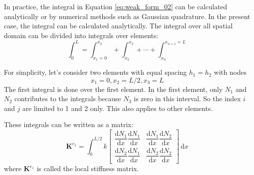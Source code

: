 \documentclass[a4paper,12pt]{article} %
\begin{document}
In practice, the integral in Equation \ref{eq:weak_form_02} can be
calculated analytically or by numerical methods such as Gaussian quadrature.
In the present case, the integral can be calculated analytically.
The integral over all spatial
domain can be divided into integrals over elements:
\begin{equation}
\int_{0}^{L} = \int_{x_{1}=0}^{x_{2}} + \int_{x_{2}}^{x_{3}} + \cdots +
\int_{x_{n}}^{x_{n+1}=L}
\end{equation}

For simplicity, let's consider two elements with equal spacing
$h_{1} = h_{2}$ with nodes
\begin{equation}
x_{1} = 0, x_{2} = L/2, x_{3} = L
\end{equation}
The first integral is done over the first element. In the first element, only
$N_{1}$ and $N_{2}$ contributes to the integrals because $N_{3}$ is zero in
this interval. So the index $i$ and $j$ are limited to 1 and 2 only.
This also applies to other elements.

These integrals can be written as a matrix:
\begin{equation}
\mathbf{K}^{e_{1}} = \int_{0}^{L/2} k \begin{bmatrix}
\dfrac{\mathrm{d}N_{1}}{\mathrm{d}x} \dfrac{\mathrm{d}N_{1}}{\mathrm{d}x} &
\dfrac{\mathrm{d}N_{1}}{\mathrm{d}x} \dfrac{\mathrm{d}N_{2}}{\mathrm{d}x} \\[10pt]
\dfrac{\mathrm{d}N_{2}}{\mathrm{d}x} \dfrac{\mathrm{d}N_{1}}{\mathrm{d}x} &
\dfrac{\mathrm{d}N_{2}}{\mathrm{d}x} \dfrac{\mathrm{d}N_{2}}{\mathrm{d}x}
\end{bmatrix}\,\mathrm{d}x
\end{equation}
where $\mathbf{K}^{e_{1}}$ is called the local stiffness matrix.
\end{document}
